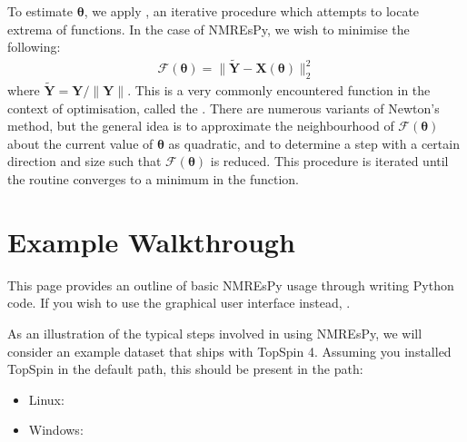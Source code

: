 \documentclass[letterpaper,10pt,english]{sphinxmanual}
\begin{document}
\sphinxAtStartPar
To estimate \(\boldsymbol{\theta}\), we apply , an
iterative procedure which attempts to locate extrema of functions.
In the case of NMR\sphinxhyphen{}EsPy, we wish to minimise the following:
\begin{equation*}
\begin{split}\mathcal{F}(\boldsymbol{\theta}) = \lVert \tilde{\boldsymbol{Y}} -
\boldsymbol{X}(\boldsymbol{\theta}) \rVert_2^2\end{split}
\end{equation*}
\sphinxAtStartPar
where \(\tilde{\boldsymbol{Y}} = \boldsymbol{Y} / \lVert \boldsymbol{Y}
\rVert\). This is a very commonly encountered function in the context of
optimisation, called the
.
There are numerous variants of Newton’s method, but the general idea
is to approximate the neighbourhood of \(\mathcal{F}(\boldsymbol{\theta})\)
about the current value of \(\boldsymbol{\theta}\) as quadratic, and to
determine a step with a certain direction and size such that
\(\mathcal{F}(\boldsymbol{\theta})\) is reduced. This procedure is iterated
until the routine converges to a minimum in the function.




\chapter{Example Walkthrough}
\label{\detokenize{walkthrough:example-walkthrough}}\label{\detokenize{walkthrough::doc}}
\sphinxAtStartPar
This page provides an outline of basic NMR\sphinxhyphen{}EsPy usage through writing
Python code. If you wish to use the graphical user interface instead,
{\hyperref[\detokenize{gui/index::doc}]{}}.

\sphinxAtStartPar
As an illustration of the typical steps involved in using NMR\sphinxhyphen{}EsPy, we will
consider an example dataset that ships with TopSpin 4. Assuming you installed
TopSpin in the default path, this should be present in the path:
\begin{itemize}
\item {} 
\sphinxAtStartPar
Linux: 

\item {} 
\sphinxAtStartPar
Windows: 

\end{itemize}
\end{document}
